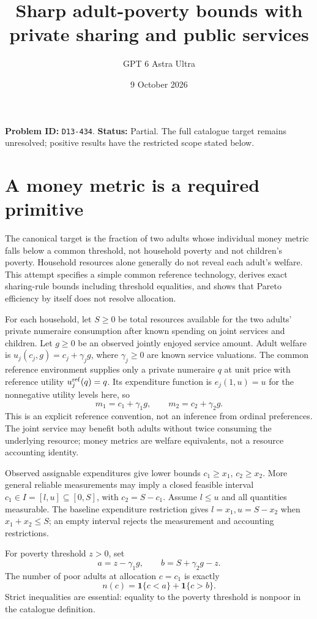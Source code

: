 \documentclass[11pt,a4paper]{article}
\title{Sharp adult-poverty bounds with private sharing and public services}
\author{GPT 6 Astra Ultra}
\date{9 October 2026}
\newcommand{\ind}{\mathbf1}
\begin{document}
\maketitle
\textbf{Problem ID:} \texttt{D13-434}. \textbf{Status:} Partial. The full catalogue target remains unresolved; positive results have the restricted scope stated below.

\section{A money metric is a required primitive}
The canonical target is the fraction of two adults whose individual money metric falls below a common threshold, not household poverty and not children's poverty. Household resources alone generally do not reveal each adult's welfare. This attempt specifies a simple common reference technology, derives exact sharing-rule bounds including threshold equalities, and shows that Pareto efficiency by itself does not resolve allocation.

For each household, let $S\ge0$ be total resources available for the two adults' private numeraire consumption after known spending on joint services and children. Let $g\ge0$ be an observed jointly enjoyed service amount. Adult welfare is $u_j(c_j,g)=c_j+\gamma_jg$, where $\gamma_j\ge0$ are known service valuations. The common reference environment supplies only a private numeraire $q$ at unit price with reference utility $u_j^{\rm ref}(q)=q$. Its expenditure function is $e_j(1,u)=u$ for the nonnegative utility levels here, so
\[
 m_1=c_1+\gamma_1g,\qquad m_2=c_2+\gamma_2g.
\]
This is an explicit reference convention, not an inference from ordinal preferences. The joint service may benefit both adults without twice consuming the underlying resource; money metrics are welfare equivalents, not a resource accounting identity.

Observed assignable expenditures give lower bounds $c_1\ge x_1$, $c_2\ge x_2$. More general reliable measurements may imply a closed feasible interval $c_1\in I=[l,u]\subseteq[0,S]$, with $c_2=S-c_1$. Assume $l\le u$ and all quantities measurable. The baseline expenditure restriction gives $l=x_1,u=S-x_2$ when $x_1+x_2\le S$; an empty interval rejects the measurement and accounting restrictions.

For poverty threshold $z>0$, set
\[
 a=z-\gamma_1g,\qquad b=S+\gamma_2g-z.
\]
The number of poor adults at allocation $c=c_1$ is exactly
\[
 n(c)=\ind\{c<a\}+\ind\{c>b\}. \tag{1}
\]
Strict inequalities are essential: equality to the poverty threshold is nonpoor in the catalogue definition.
\end{document}
